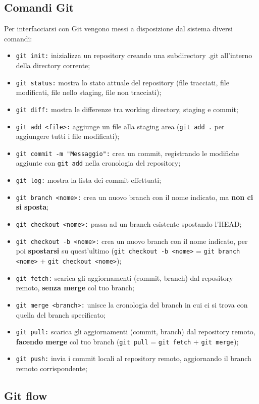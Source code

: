 \documentclass[12pt]{article}
\begin{document}
    \subsection{Comandi Git}
    Per interfacciarsi con Git vengono messi a disposizione dal sistema diversi comandi:
    \begin{itemize}
      \item \texttt{git init:} inizializza un repository creando una subdirectory .git all'interno della directory corrente; 
      \item \texttt{git status:} mostra lo stato attuale del repository (file tracciati, file modificati, file nello staging, file non tracciati);
      \item \texttt{git diff:} mostra le differenze tra working directory, staging e commit;
      \item \texttt{git add <file>:} aggiunge un file alla staging area (\texttt{git add .} per aggiungere tutti i file modificati);
      \item \texttt{git commit -m "Messaggio":} crea un commit, registrando le modifiche aggiunte con \texttt{git add} nella cronologia del repository;
      \item \texttt{git log:} mostra la lista dei commit effettuati;
      \item \texttt{git branch <nome>:} crea un nuovo branch con il nome indicato, ma \textbf{non ci si sposta};
      \item \texttt{git checkout <nome>:} passa ad un branch esistente spostando l'HEAD;
      \item \texttt{git checkout -b <nome>:} crea un nuovo branch con il nome indicato, per poi \textbf{spostarsi} su quest'ultimo (\texttt{git checkout -b <nome>} = \texttt{git branch <nome>} + \texttt{git checkout <nome>});
      \item \texttt{git fetch:} scarica gli aggiornamenti (commit, branch) dal repository remoto, \textbf{senza merge} col tuo branch;
      \item \texttt{git merge <branch>:} unisce la cronologia del branch in cui ci si trova con quella del branch specificato;
      \item \texttt{git pull:} scarica gli aggiornamenti (commit, branch) dal repository remoto, \textbf{facendo merge} col tuo branch (\texttt{git pull} = \texttt{git fetch} + \texttt{git merge});
      \item \texttt{git push:} invia i commit locali al repository remoto, aggiornando il branch remoto corrispondente; 
    \end{itemize}

    \subsection{Git flow}
\end{document}
